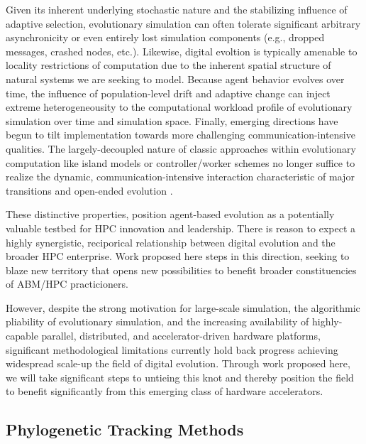 Given its inherent underlying stochastic nature and the stabilizing influence of adaptive selection, evolutionary simulation can often tolerate significant arbitrary asynchronicity or even entirely lost simulation components (e.g., dropped messages, crashed nodes, etc.).
Likewise, digital evoltion is typically amenable to locality restrictions of computation due to the inherent spatial structure of natural systems we are seeking to model.
Because agent behavior evolves over time, the influence of population-level drift and adaptive change can inject extreme heterogeneousity to the computational workload profile of evolutionary simulation over time and simulation space.
Finally, emerging directions have begun to tilt implementation towards more challenging communication-intensive qualities.
The largely-decoupled nature of classic approaches within evolutionary computation like island models or controller/worker schemes  \citep{kozabeowulf,someproblematic90spaper} no longer suffice to realize the dynamic, communication-intensive interaction characteristic of major transitions and open-ended evolution \citep{morenoDissertationTODO}.

These distinctive properties, position agent-based evolution as a potentially valuable testbed for HPC innovation and leadership.
There is reason to expect a highly synergistic, reciporical relationship between digital evolution and the broader HPC enterprise.
Work proposed here steps in this direction, seeking to blaze new territory that opens new possibilities to benefit broader constituencies of ABM/HPC practicioners.

However, despite the strong motivation for large-scale simulation, the algorithmic pliability of evolutionary simulation, and the increasing availability of highly-capable parallel, distributed, and accelerator-driven hardware platforms, significant methodological limitations currently hold back progress achieving widespread scale-up the field of digital evolution.
Through work proposed here, we will take significant steps to untieing this knot and thereby position the field to benefit significantly from this emerging class of hardware accelerators.

\subsection{Phylogenetic Tracking Methods}

